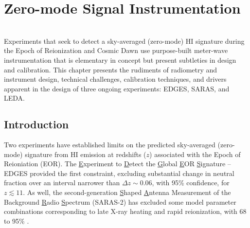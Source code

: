 



\setcounter{chapter}{6} 

\chapter{Zero-mode Signal Instrumentation}

\begin{bf}
\author{  
L. J. Greenhill 
(Harvard-Smithsonian Center for Astrophysics) \\
R. Subrahmanyan 
(Raman Research Institute)   
}\\

\noindent
Experiments that seek to detect a sky-averaged (zero-mode) HI signature during the Epoch of Reionization and Cosmic Dawn use purpose-built meter-wave instrumentation that is elementary in concept but present subtleties in design and calibration.  This chapter presents the rudiments of radiometry and instrument design, technical challenges, calibration techniques, and drivers apparent in the design of three ongoing experiments: EDGES, SARAS, and LEDA. \\

\end{bf}

\section{Introduction}

Two experiments have established limits on the predicted sky-averaged (zero-mode) signature from HI emission at redshifts ($z$) associated with the Epoch of Reioniation (EOR).  The {\underline E}xperiment to {\underline D}etect the {\underline G}lobal {\underline E}OR {\underline S}ignature -- EDGES \cite{bowman08,rogers12} provided the first constraint, excluding substantial change in neutral fraction over an interval narrower than $\Delta z\sim 0.06$, with 95\% confidence, for $z\lesssim 11$.  As well, the second-generation {\underline S}haped {\underline A}ntenna Measurement of the Background {\underline Ra}dio {\underline S}pectrum (SARAS-2) has excluded some model parameter combinations corresponding to late X-ray heating and rapid reionization, with 68 to 95\% \cite{patra13, singh17, singh18}.

